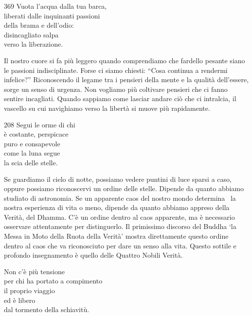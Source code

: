 
\begin{dhpVerse}{369}
\label{dhp-369}
Vuota l'acqua dalla tua barca,\\
liberati dalle inquinanti passioni\\
della brama e dell'odio:\\
disincagliato salpa\\
verso la liberazione.
\end{dhpVerse}

\begin{dhpRefl}
Il nostro cuore si fa più leggero quando comprendiamo che fardello pesante siano le passioni indisciplinate. Forse ci siamo chiesti: ``Cosa continua a rendermi infelice?'' Riconoscendo il legame tra i pensieri della mente e la qualit\`{a} dell'essere, sorge un senso di urgenza. Non vogliamo più coltivare pensieri che ci fanno sentire incagliati. Quando sappiamo come lasciar andare ci\`{o} che ci intralcia, il vascello su cui navighiamo verso la libert\`{a} si muove più rapidamente.
\end{dhpRefl}


\begin{dhpVerse}{208}
\label{dhp-208}
Segui le orme di chi\\
\`{e} costante, perspicace\\
puro e consapevole\\
come la luna segue\\
la scia delle stelle.
\end{dhpVerse}

\begin{dhpRefl}
Se guardiamo il cielo di notte, possiamo vedere puntini di luce sparsi a caso, oppure possiamo riconoscervi un ordine delle stelle. Dipende da quanto abbiamo studiato di astronomia. Se un apparente caos del nostro mondo determina  la nostra esperienza di vita o meno, dipende da quanto abbiamo appreso della Verit\`{a}, del Dhamma. C'\`{e} un ordine dentro al caos apparente, ma \`{e} necessario osservare attentamente per distinguerlo. Il primissimo discorso del Buddha `la Messa in Moto della Ruota della Verit\`{a}' mostra direttamente questo ordine dentro al caos che va riconosciuto per dare un senso alla vita. Questo sottile e profondo insegnamento \`{e} quello delle Quattro Nobili Verit\`{a}.
\end{dhpRefl}


\begin{dhpVerse}{90}
\label{dhp-90}
Non c'\`{e} più tensione\\
per chi ha portato a compimento\\
il proprio viaggio\\
ed \`{e} libero\\
dal tormento della schiavitù.
\end{dhpVerse}


